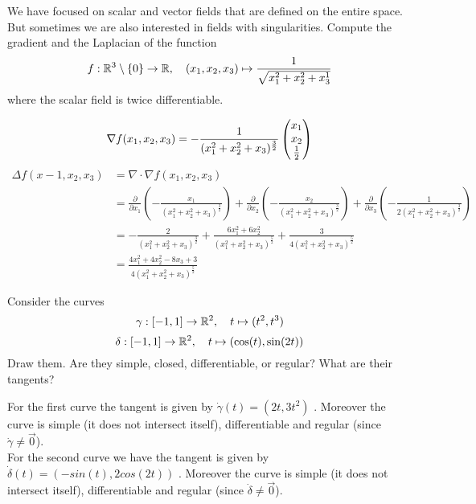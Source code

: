\documentclass[11pt]{article}
\begin{document}
\def\hidesolutions{}

\begin{exercise}
    We have focused on scalar and vector fields that are defined on the entire space. 
    But sometimes we are also interested in fields with singularities. 
    Compute the gradient and the Laplacian of the function 
    \[
        f : \mathbb{R}^3 \setminus \{0\} \rightarrow \mathbb{R}, \quad (x_1,x_2,x_3) \mapsto \frac{1}{\sqrt{x_1^2+x_2^2+x_3^1}}
    \]
    where the scalar field is twice differentiable. 
\end{exercise}
\begin{solution}   
	$$\nabla f(x_1,x_2,x_3) =-\frac{1}{(x_1^2+x_2^2+x_3)^{\frac{3}{2}}} \begin{pmatrix}x_1\\ x_2\\\frac{1}{2}\end{pmatrix}$$ 
\begin{align*}\Delta f(x-1,x_2,x_3) &= \nabla \cdot \nabla f(x_1,x_2,x_3) \\
								&= \frac{\partial}{\partial x_1}\left(-\frac{x_1}{(x_1^2+x_2^2+x_3)^{\frac{3}{2}}} \right) + \frac{\partial}{\partial x_2}\left(-\frac{x_2}{(x_1^2+x_2^2+x_3)^{\frac{3}{2}}}\right) + \frac{\partial}{\partial x_3}\left(-\frac{1}{2(x_1^2+x_2^2+x_3)^{\frac{3}{2}}} \right)\\
&= -\frac{2}{(x_1^2+x_2^2+x_3)^{\frac{3}{2}}} + \frac{6x_1^2 + 6x_2^2}{(x_1^2+x_2^2+x_3)^{\frac{5}{2}}} + \frac{3}{4(x_1^2+x_2^2+x_3)^{\frac{5}{2}}}\\
&=\frac{4x_1^2 + 4x_2^2 -8x_3 +3}{4(x_1^2+x_2^2+x_3)^{\frac{5}{2}}}
\end{align*}
\end{solution}

\begin{exercise}
    Consider the curves 
    \[
        \gamma : [-1,1] \rightarrow \mathbb{R}^2, \quad t \mapsto ( t^2, t^3 )
    \]
    \[
        \delta : [-1,1] \rightarrow \mathbb{R}^2, \quad t \mapsto ( \cos(t), \sin(2t) )
    \]
    Draw them. Are they simple, closed, differentiable, or regular? What are their tangents?
\end{exercise}
\begin{solution}    
 For the first curve the tangent is given by $\dot{\gamma}(t) = (2t, 3t^2)$ . Moreover the curve is simple (it does not intersect itself), differentiable and regular (since $\dot{\gamma} \neq \vec{0}$).\\

For the second curve we have the tangent is given by $\dot{\delta}(t) = (-sin(t),2cos(2t))$ . Moreover the curve is simple (it does not intersect itself), differentiable and regular (since $\dot{\delta} \neq \vec{0}$).\\
\end{solution}
\end{document}
